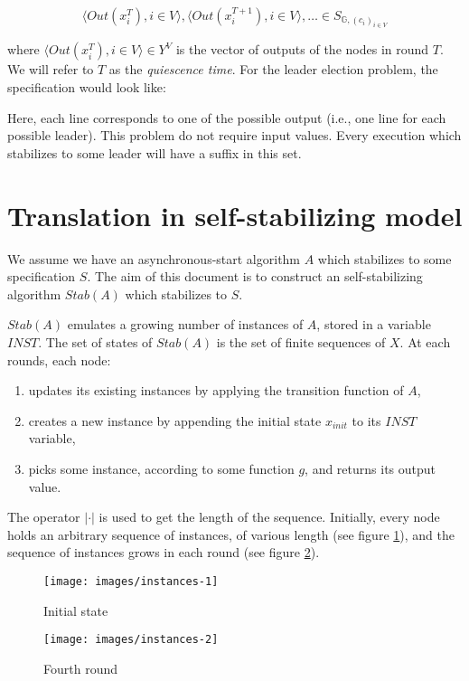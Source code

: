 \documentclass[11pt,letterpaper]{article}
\begin{document}
$$\langle Out(x^T_i), i \in V \rangle, \langle Out(x^{T+1}_i), i \in V \rangle, \dots \in S_{\mathds{G}, (c_i)_{i \in V}}$$

where $\langle Out(x^T_i), i \in V \rangle \in Y^V$ is the vector of outputs of the nodes in round $T$.
We will refer to $T$ as the \textit{quiescence time}.
For the leader election problem, the specification would look like:

Here, each line corresponds to one of the possible output (i.e., one line for each possible leader).
This problem do not require input values.
Every execution which stabilizes to some leader will have a suffix in this set.

\section{Translation in self-stabilizing model}

We assume we have an asynchronous-start algorithm $A$ which stabilizes to some specification $S$.
The aim of this document is to construct an self-stabilizing algorithm $Stab(A)$ which stabilizes to $S$.

$Stab(A)$ emulates a growing number of instances of $A$, stored in a variable $INST$.
The set of states of $Stab(A)$ is the set of finite sequences of $X$.
At each rounds, each node:
\begin{enumerate}
	\item updates its existing instances by applying the transition function of $A$,
	\item creates a new instance by appending the initial state $x_{init}$ to its $INST$ variable,
	\item picks some instance, according to some function $g$, and returns its output value.
\end{enumerate}

The operator $|\cdot|$ is used to get the length of the sequence.
Initially, every node holds an arbitrary sequence of instances, of various length (see figure \ref{fig:fig1}), and the sequence of instances grows in each round (see figure \ref{fig:fig2}).

\begin{figure}[h!]
	\texttt{[image: images/instances-1]}
	\caption{Initial state}
	\label{fig:fig1}
\end{figure}

\begin{figure}[h!]
	\texttt{[image: images/instances-2]}
	\caption{Fourth round}
	\label{fig:fig2}
\end{figure}
\end{document}
